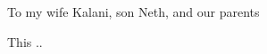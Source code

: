 \begin{dedication}

To my wife Kalani, son Neth, and our parents

\vspace{1em}

This ..

\end{dedication}
